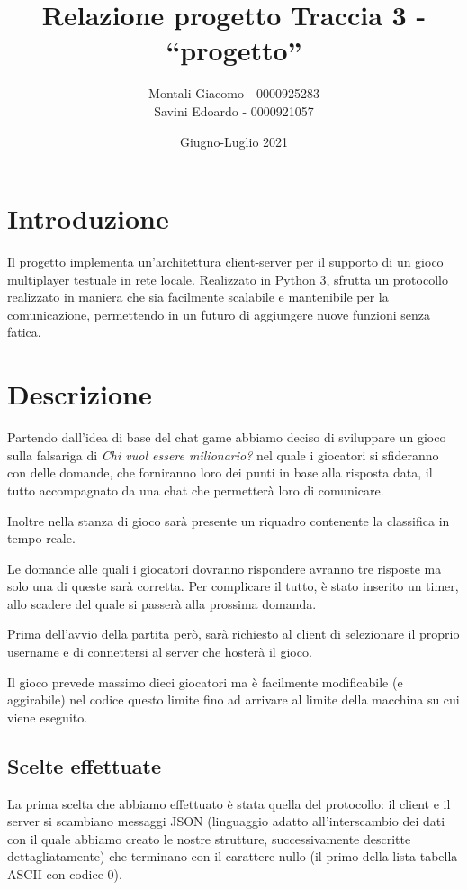 \documentclass[a4paper,12pt]{report}
\title{\textbf{Relazione progetto} \break Traccia 3 - ``progetto''}
\author{Montali Giacomo - 0000925283 \\ Savini Edoardo - 0000921057}
\date{Giugno-Luglio 2021}
\begin{document}
	
\maketitle

\chapter{Introduzione}
Il progetto implementa un'architettura client-server per il supporto di un gioco multiplayer testuale in rete locale. Realizzato in Python 3, sfrutta un protocollo realizzato in maniera che sia facilmente scalabile e mantenibile per la comunicazione, permettendo in un futuro di aggiungere nuove funzioni senza fatica.
			
\chapter{Descrizione}
Partendo dall'idea di base del chat game abbiamo deciso di sviluppare un gioco sulla falsariga di \emph{Chi vuol essere milionario?} nel quale i giocatori si sfideranno con delle domande, che forniranno loro dei punti in base alla risposta data, il tutto accompagnato da una chat che permetterà loro di comunicare.

Inoltre nella stanza di gioco sarà presente un riquadro contenente la classifica in tempo reale. 

Le domande alle quali i giocatori dovranno rispondere avranno tre risposte ma solo una di queste sarà corretta. Per complicare il tutto, è stato inserito un timer, allo scadere del quale si passerà alla prossima domanda.

Prima dell'avvio della partita però, sarà richiesto al client di selezionare il proprio username e di connettersi al server che hosterà il gioco.
			
Il gioco prevede massimo dieci giocatori ma è facilmente modificabile (e aggirabile) nel codice questo limite fino ad arrivare al limite della macchina su cui viene eseguito.
			
\section{Scelte effettuate}

La prima scelta che abbiamo effettuato è stata quella del protocollo: il client e il server si scambiano messaggi JSON (linguaggio adatto all'interscambio dei dati con il quale abbiamo creato le nostre strutture, successivamente descritte dettagliatamente) che terminano con il carattere nullo (il primo della lista tabella ASCII con codice 0).
\end{document}
